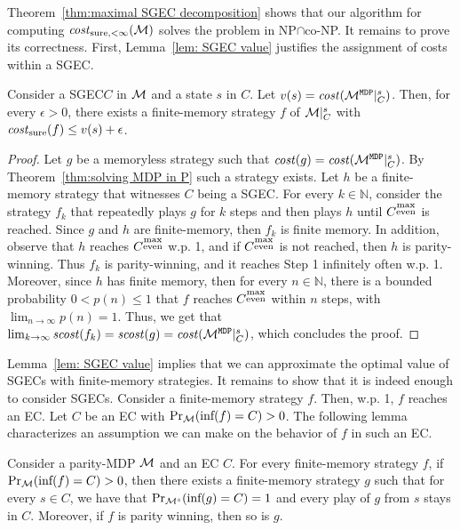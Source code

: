 \documentclass[runningheads,a4paper]{llncs}
\newcommand{\Nat}{\mathbb{N}}
\newcommand{\M}{{\cal M}}
\newcommand{\MDP}{{\mathtt{MDP}}}
\newcommand{\Inf}{\mbox{inf}}
\newcommand{\scost}{{\it scost}}
\newcommand{\cost}{{\it cost}}
\newcommand{\costs}{{\it cost}_{\rm sure}}
\newcommand{\costsf}{{\it cost}_{\rm sure,<\infty}}
\newcommand{\sgec}{{SGEC}\xspace}
\newcommand{\sgecs}{{SGECs}\xspace}
\newcommand{\me}{{\substack{\rm max\\ \rm even}}}
\begin{document}
Theorem~\ref{thm:maximal SGEC decomposition} shows that our algorithm for computing $\costsf(\M)$ solves the problem in NP$\cap$co-NP. 
It remains to prove its correctness.
First, Lemma~\ref{lem: SGEC value} justifies the assignment of costs within a \sgec.
\vspace*{-5pt}
\begin{lemma}
\label{lem: SGEC value}
Consider a \sgec $C$ in $\M$ and a state $s$ in $C$. Let $v(s)=\cost(\M^{\MDP}|^s_C)$. 
Then, for every $\epsilon>0$, there exists a finite-memory strategy $f$ of $\M|^s_C$ with $\costs(f)\le v(s)+\epsilon$. 
\end{lemma}
\vspace*{-10pt}
\begin{proof}
Let $g$ be a memoryless strategy such that $\cost(g)=\cost(\M^{\MDP}|_C^s)$. By Theorem~\ref{thm:solving MDP in P} such a strategy exists. Let $h$ be a finite-memory strategy that witnesses $C$ being a \sgec.
For every $k\in \Nat$, consider the strategy $f_k$ that repeatedly plays $g$ for $k$ steps and then plays $h$ until $C^{\me}$ is reached.
Since $g$ and $h$ are finite-memory, then $f_k$ is finite memory. In addition, observe that $h$ reaches $C^{\me}$ w.p. 1, and if $C^{\me}$ is not reached, then $h$ is parity-winning. Thus $f_k$ is parity-winning, and it reaches Step 1 infinitely often w.p. 1. Moreover, since $h$ has finite memory, then for every $n\in \Nat$, there is a bounded probability $0<p(n)\le 1$ that $f$ reaches $C^{\me}$ within $n$ steps, with $\lim_{n\to \infty}p(n)=1$. Thus, we get that $\lim_{k\to \infty}\scost(f_k)=\scost(g)=\cost(\M^{\MDP}|^s_C)$, which concludes the proof.
\end{proof}

\vspace*{-10pt}
Lemma~\ref{lem: SGEC value} implies that we can approximate the optimal value of \sgecs with finite-memory strategies. 
It remains to show that it is indeed enough to consider \sgecs. Consider a finite-memory strategy $f$. Then, w.p. 1, $f$ reaches an EC. Let $C$ be an EC with $\Pr_{\M}(\Inf(f)=C)>0$. The following lemma characterizes an assumption we can make on the behavior of $f$ in such an EC.
\vspace*{-5pt}
\begin{lemma}
\label{lem:finite memory EC prob 1}
Consider a parity-MDP $\M$ and an EC $C$. For every finite-memory strategy $f$, if $\Pr_{\M}(\Inf(f)=C)>0$, then there exists a finite-memory strategy $g$ such that for every $s\in C$, we have that $\Pr_{\M^s}(\Inf(g)=C)=1$ and every play of $g$ from $s$ stays in $C$. Moreover, if $f$ is parity winning, then so is $g$.
\end{lemma}
\vspace*{-5pt}
\end{document}
